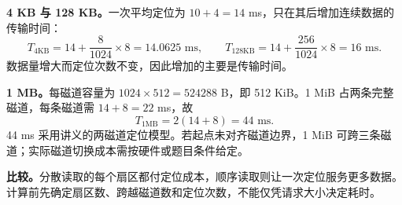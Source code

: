 \begin{workedsolution}
\textbf{4 KB 与 128 KB。}一次平均定位为 $10+4=14$ ms，只在其后增加连续数据的传输时间：
\[
  T_{4\mathrm{KB}}=14+\frac{8}{1024}\times8
  =\boxed{14.0625\text{ ms}},\qquad
  T_{128\mathrm{KB}}=14+\frac{256}{1024}\times8
  =\boxed{16\text{ ms}}.
\]
数据量增大而定位次数不变，因此增加的主要是传输时间。

\textbf{1 MB。}每磁道容量为 $1024\times512=524288$ B，即 512 KiB。1 MiB 占两条完整磁道，每条磁道需 $14+8=22$ ms，故
\[
  T_{1\mathrm{MB}}=2(14+8)=\boxed{44\text{ ms}}.
\]
44 ms 采用讲义的两磁道定位模型。若起点未对齐磁道边界，1 MiB 可跨三条磁道；实际磁道切换成本需按硬件或题目条件给定。

\textbf{比较。}分散读取的每个扇区都付定位成本，顺序读取则让一次定位服务更多数据。计算前先确定扇区数、跨越磁道数和定位次数，不能仅凭请求大小决定耗时。
\end{workedsolution}
\endgroup
